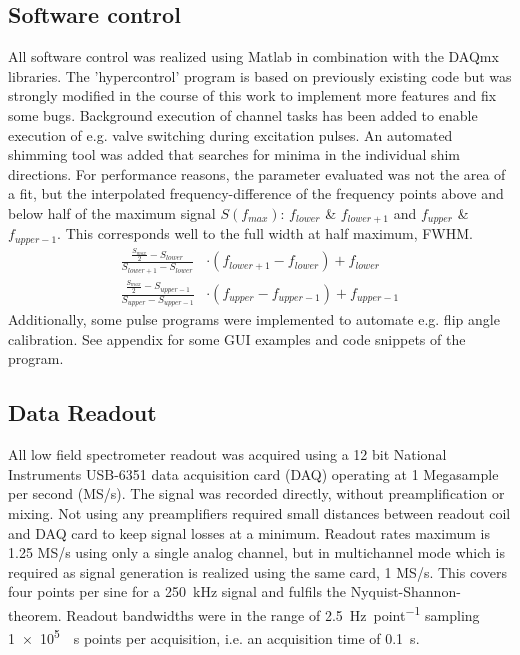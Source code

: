         \subsection{Software control}
        \label{sec:matMeth:hypercontrol}
        All software control was realized using Matlab in combination with the DAQmx libraries. The 'hypercontrol' program is based on previously existing code but was strongly modified in the course of this work to implement more features and fix some bugs. Background execution of channel tasks has been added to enable execution of e.g. valve switching during excitation pulses. An automated shimming tool was added that searches for minima in the individual shim directions. For performance reasons, the parameter evaluated was not the area of a fit, but the interpolated frequency-difference of the frequency points above and below half of the maximum signal $S(f_{max})$: $f_{lower}$ \& $f_{lower+1}$ and $f_{upper}$ \& $f_{upper-1}$. This corresponds well to the full width at half maximum, FWHM.
        \begin{equation}
            \begin{aligned}
                \frac{\frac{S_{max}}{2} - S_{lower}}{S_{lower+1} -S_{lower}}&\cdot (f_{lower + 1} -f_{lower}) + f_{lower}\\
                \frac{\frac{S_{max}}{2} - S_{upper -1}}{S_{upper} -S_{upper-1}}& \cdot (f_{upper} -f_{upper-1}) + f_{upper -1}
            \end{aligned}
        \end{equation}
            Additionally, some pulse programs were implemented to automate e.g. flip angle calibration. See appendix for some GUI examples and code snippets of the program.
        \subsection{Data Readout}
        All low field spectrometer readout was acquired using a 12 bit National Instruments USB-6351 data acquisition card (DAQ) operating at 1 Megasample per second (MS/s). The signal was recorded directly, without preamplification or mixing. Not using any preamplifiers required small distances between readout coil and DAQ card to keep signal losses at a minimum. Readout rates maximum is 1.25 MS/s using only a single analog channel, but in multichannel mode which is required as signal generation is realized using the same card, 1 MS/s. This covers four points per sine for a \SI{250}{\kilo\hertz} signal and fulfils the Nyquist-Shannon-theorem. Readout bandwidths were in the range of \SI{2.5}{\hertz\per point} sampling \SI{1e5}{\per\second} points per acquisition, i.e. an acquisition time of \SI{0.1}{\second}.
